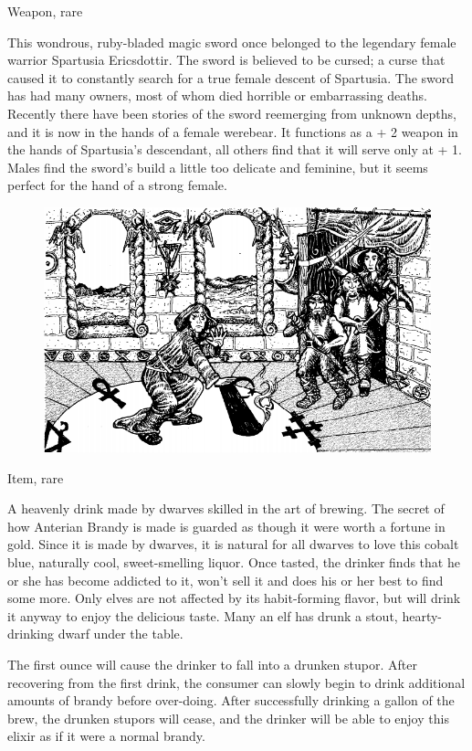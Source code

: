 \documentclass[palace_of_the_silver_princess]{subfiles}
\begin{document}
{Weapon, rare}

This wondrous, ruby-bladed magic sword once belonged to the legendary
female warrior Spartusia Ericsdottir. The sword is believed to be
cursed; a curse that caused it to constantly search for a true female
descent of Spartusia. The sword has had many owners, most of whom died
horrible or embarrassing deaths. Recently there have been stories of
the sword reemerging from unknown depths, and it is now in the hands of
a female werebear. It functions as a + 2 weapon in the hands of
Spartusia’s descendant, all others find that it will serve only at + 1.
Males find the sword’s build a little too delicate and feminine, but it
seems perfect for the hand of a strong female.

\begin{figure}[!ht]
    \includegraphics[width=\textwidth]{img/cleric.png}
\end{figure}

{Item, rare}

A heavenly drink made by dwarves skilled in the art of brewing. The
secret of how Anterian Brandy is made is guarded as though it were worth
a fortune in gold. Since it is made by dwarves, it is natural for all
dwarves to love this cobalt blue, naturally cool, sweet-smelling liquor.
Once tasted, the drinker finds that he or she has become addicted to it,
won’t sell it and does his or her best to find some more. Only elves are
not affected by its habit-forming flavor, but will drink it anyway to
enjoy the delicious taste. Many an elf has drunk a stout,
hearty-drinking dwarf under the table.

The first ounce will cause the drinker to fall into a drunken stupor.
After recovering from the first drink, the consumer can slowly begin to
drink additional amounts of brandy before over-doing. After
successfully drinking a gallon of the brew, the drunken stupors will
cease, and the drinker will be able to enjoy this elixir as if it were a
normal brandy.
\end{document}
